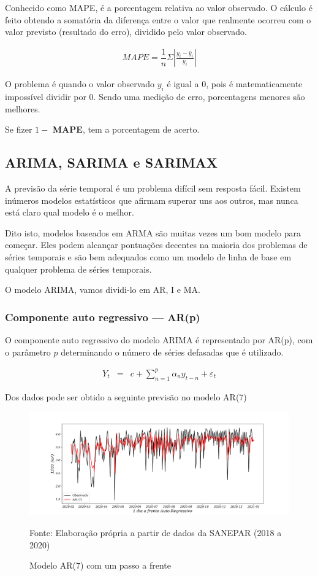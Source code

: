 Conhecido como MAPE, é a porcentagem relativa ao valor observado. O cálculo é feito obtendo a somatória da diferença entre o valor que realmente ocorreu com o valor previsto (resultado do erro), dividido pelo valor observado.

\begin{eqnarray}
	M A P E=\dfrac{1}{n} \Sigma\left|\frac{y_i-\hat{y}_i}{y_i}\right|\label{eq:mape}
\end{eqnarray}

O problema é quando o valor observado $y_i$ é igual a $0$, pois é matematicamente impossível dividir por $0$. Sendo uma medição de erro, porcentagens menores são melhores.

Se fizer $1 -$ \textbf{MAPE}, tem a porcentagem de acerto.

\subsection{ARIMA, SARIMA e SARIMAX}\label{subsec:arima}

A previsão da série temporal é um problema difícil sem resposta fácil. Existem inúmeros modelos estatísticos que afirmam superar uns aos outros, mas nunca está claro qual modelo é o melhor.

Dito isto, modelos baseados em ARMA são muitas vezes um bom modelo para começar. Eles podem alcançar pontuações decentes na maioria dos problemas de séries temporais e são bem adequados como um modelo de linha de base em qualquer problema de séries temporais.


O modelo ARIMA, vamos dividi-lo em AR, I e MA.

\subsubsection{Componente auto regressivo — AR(p)}

O componente auto regressivo do modelo ARIMA é representado por AR(p), com o parâmetro $ p $ determinando o número de séries defasadas que é utilizado.

\begin{eqnarray}
	Y_t&=&c+\sum_{n=1}^{p} \alpha_n y_{t-n} + \varepsilon_t\label{AR}
\end{eqnarray}

Dos dados pode ser obtido a seguinte previsão no modelo AR(7)

\begin{figure}[H]
	\centering
	\caption{Modelo AR(7) com um passo a frente}
	\label{fig:1-ar}
	\includegraphics[width=1\linewidth]{Modelos/Figuras/1-AR}
	
	Fonte: Elaboração própria a partir de dados da SANEPAR (2018 a 2020)
\end{figure}

